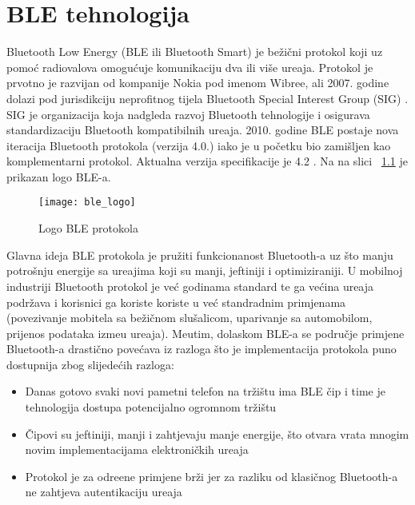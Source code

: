 \chapter{BLE tehnologija}
Bluetooth Low Energy (BLE ili Bluetooth Smart) je be\v{z}i\v{c}ni protokol koji uz pomo\'{c} radiovalova omogu\'{c}uje komunikaciju dva ili vi\v{s}e ure\dj aja. Protokol je prvotno je razvijan od kompanije Nokia pod imenom Wibree, ali 2007. godine dolazi pod jurisdikciju neprofitnog tijela Bluetooth Special Interest Group (SIG) \cite{sig}. SIG je organizacija koja nadgleda razvoj Bluetooth tehnologije i osigurava standardizaciju Bluetooth kompatibilnih ure\dj aja. 2010. godine BLE postaje nova iteracija Bluetooth protokola (verzija 4.0.) iako je u po\v{c}etku bio zami\v{s}ljen kao komplementarni protokol. Aktualna verzija specifikacije je 4.2 \cite{ble_specification}. Na na slici ~\ref{fig:ble} je prikazan logo BLE-a.

\begin{figure}[!htbp]
	\begin{center}
 \texttt{[image: ble\_logo]}
 \caption{Logo BLE protokola}
 \label{fig:ble}
	\end{center}
\end{figure}

Glavna ideja BLE protokola je pru\v{z}iti funkcionanost Bluetooth-a uz \v{s}to manju potro\v{s}nju energije sa ure\dj ajima koji su manji, jeftiniji i optimiziraniji. U mobilnoj industriji Bluetooth protokol je ve\'{c} godinama standard te ga ve\'{c}ina ure\dj aja podr\v{z}ava i korisnici ga koriste koriste u ve\'{c} standradnim primjenama (povezivanje mobitela sa be\v{z}i\v{c}nom slu\v{s}alicom, uparivanje sa automobilom, prijenos podataka izme\dj u ure\dj aja). Me\dj utim, dolaskom BLE-a se podru\v{c}je primjene Bluetooth-a drasti\v{c}no pove\'{c}ava iz razloga \v{s}to je implementacija protokola puno dostupnija zbog slijede\'{c}ih razloga:

\begin{itemize}
	\item Danas gotovo svaki novi pametni telefon na tr\v{z}i\v{s}tu ima BLE \v{c}ip i time je tehnologija dostupa potencijalno ogromnom tr\v{z}i\v{s}tu
	\item \v{C}ipovi su jeftiniji, manji i zahtjevaju manje energije, \v{s}to otvara vrata mnogim novim implementacijama elektroni\v{c}kih ure\dj aja
	\item Protokol je za odre\dj ene primjene br\v{z}i jer za razliku od klasi\v{c}nog Bluetooth-a ne zahtjeva autentikaciju ure\dj aja
\end{itemize}

